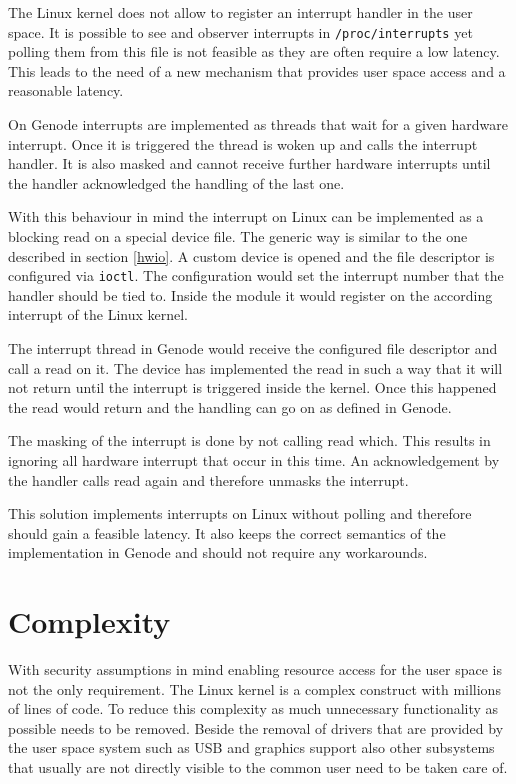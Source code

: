 \documentclass[
a4paper,
12pt,
notitlepage,
parskip=half,
DIV=11,
]{scrbook}
\begin{document}
		The Linux kernel does not allow to register an interrupt handler in the user space.
		It is possible to see and observer interrupts in \texttt{/proc/interrupts} yet polling them from this file is not feasible as they are often require a low latency.
		This leads to the need of a new mechanism that provides user space access and a reasonable latency.
		
		On Genode interrupts are implemented as threads that wait for a given hardware interrupt.
		Once it is triggered the thread is woken up and calls the interrupt handler.
		It is also masked and cannot receive further hardware interrupts until the handler acknowledged the handling of the last one. \citep{genode}
		
		With this behaviour in mind the interrupt on Linux can be implemented as a blocking read on a special device file.
		The generic way is similar to the one described in section \ref{hwio}.
		A custom device is opened and the file descriptor is configured via \texttt{ioctl}.
		The configuration would set the interrupt number that the handler should be tied to.
		Inside the module it would register on the according interrupt of the Linux kernel.
		
		The interrupt thread in Genode would receive the configured file descriptor and call a read on it.
		The device has implemented the read in such a way that it will not return until the interrupt is triggered inside the kernel.
		Once this happened the read would return and the handling can go on as defined in Genode.
		
		The masking of the interrupt is done by not calling read which.
		This results in ignoring all hardware interrupt that occur in this time.
		An acknowledgement by the handler calls read again and therefore unmasks the interrupt.
		
		This solution implements interrupts on Linux without polling and therefore should gain a feasible latency.
		It also keeps the correct semantics of the implementation in Genode and should not require any workarounds.
		
		\section{Complexity}
		
		With security assumptions in mind enabling resource access for the user space is not the only requirement.
		The Linux kernel is a complex construct with millions of lines of code.
		To reduce this complexity as much unnecessary functionality as possible needs to be removed.
		Beside the removal of drivers that are provided by the user space system such as USB and graphics support also other subsystems that usually are not directly visible to the common user need to be taken care of.
		
\end{document}
